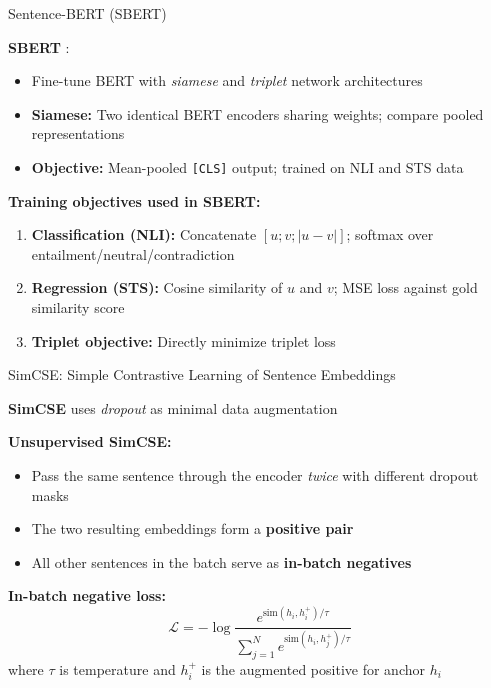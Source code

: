 \documentclass[11pt,compress,t,notes=noshow, xcolor=table]{beamer}
\begin{document}
\begin{frame}{Sentence-BERT (SBERT)}

\vfill

\textbf{SBERT} :

\begin{itemize}
  \item Fine-tune BERT with \textit{siamese} and \textit{triplet} network architectures
  \item \textbf{Siamese:} Two identical BERT encoders sharing weights; compare pooled representations
  \item \textbf{Objective:} Mean-pooled \texttt{[CLS]} output; trained on NLI and STS data
\end{itemize}

\vfill

\textbf{Training objectives used in SBERT:}
\begin{enumerate}
  \item \textbf{Classification (NLI):} Concatenate $[u; v; |u - v|]$; softmax over entailment/neutral/contradiction
  \item \textbf{Regression (STS):} Cosine similarity of $u$ and $v$; MSE loss against gold similarity score
  \item \textbf{Triplet objective:} Directly minimize triplet loss
\end{enumerate}

\vfill

\end{frame}


\begin{frame}{SimCSE: Simple Contrastive Learning of Sentence Embeddings}

\vfill

\textbf{SimCSE}  uses \textit{dropout} as minimal data augmentation

\vfill

\textbf{Unsupervised SimCSE:}
\begin{itemize}
  \item Pass the same sentence through the encoder \textit{twice} with different dropout masks
  \item The two resulting embeddings form a \textbf{positive pair}
  \item All other sentences in the batch serve as \textbf{in-batch negatives}
\end{itemize}

\vfill

\textbf{In-batch negative loss:}
$$\mathcal{L} = -\log \frac{e^{\text{sim}(h_i, h_i^+)/\tau}}{\sum_{j=1}^{N} e^{\text{sim}(h_i, h_j^+)/\tau}}$$
where $\tau$ is temperature and $h_i^+$ is the augmented positive for anchor $h_i$

\vfill

\end{frame}
\end{document}
